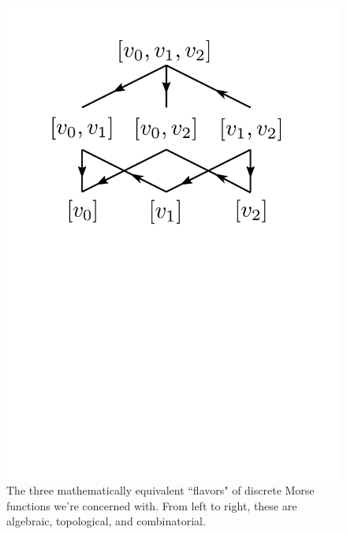 \documentclass[11pt]{article}
\begin{document}
\begin{figure}
	\includegraphics[scale=0.25]{combinatorics.pdf}
	\caption{The three mathematically equivalent ``flavors" of discrete Morse functions we're concerned with. From left to right, these are algebraic, topological, and combinatorial.}
\end{figure}
\end{document}
